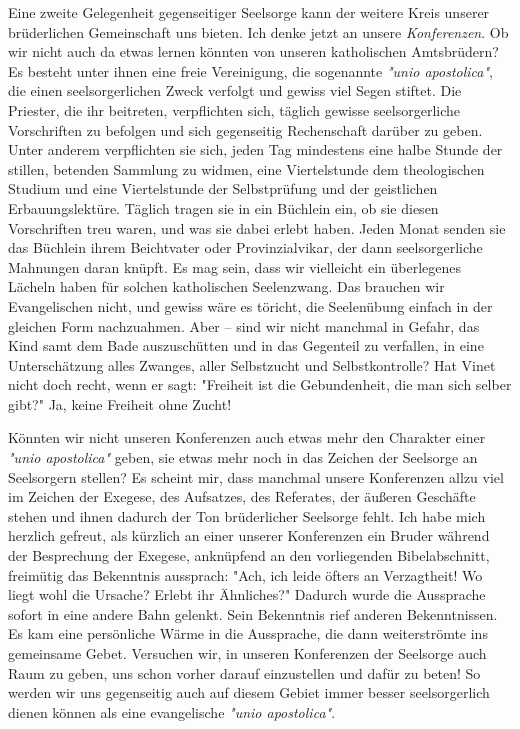 \documentclass[a5paper,openany]{book}
\begin{document}
Eine zweite Gelegenheit gegenseitiger Seelsorge kann der weitere Kreis unserer brüderlichen Gemeinschaft uns bieten. Ich denke jetzt an unsere \emph{Konferenzen}. Ob wir nicht auch da etwas lernen könnten von unseren katholischen Amtsbrüdern? Es besteht unter ihnen eine freie Vereinigung, die sogenannte \emph{"unio apostolica"}, die einen seelsorgerlichen Zweck verfolgt und gewiss viel Segen stiftet. Die Priester, die ihr beitreten, verpflichten sich, täglich gewisse seelsorgerliche Vorschriften zu befolgen und sich gegenseitig Rechenschaft darüber zu geben. Unter anderem verpflichten sie sich, jeden Tag mindestens eine halbe Stunde der stillen, betenden Sammlung zu widmen, eine Viertelstunde dem theologischen Studium und eine Viertelstunde der Selbstprüfung und der geistlichen Erbauungslektüre. Täglich tragen sie in ein Büchlein ein, ob sie diesen Vorschriften treu waren, und was sie dabei erlebt haben. Jeden Monat senden sie das Büchlein ihrem Beichtvater oder Provinzialvikar, der dann seelsorgerliche Mahnungen daran knüpft. Es mag sein, dass wir vielleicht ein überlegenes Lächeln haben für solchen katholischen Seelenzwang. Das brauchen wir Evangelischen nicht, und gewiss wäre es töricht, die Seelenübung einfach in der gleichen Form nachzuahmen. Aber – sind wir nicht manchmal in Gefahr, das Kind samt dem Bade auszuschütten und in das Gegenteil zu verfallen, in eine Unterschätzung alles Zwanges, aller Selbstzucht und Selbstkontrolle? Hat Vinet nicht doch recht, wenn er sagt: "Freiheit ist die Gebundenheit, die man sich selber gibt?" Ja, keine Freiheit ohne Zucht!
\par
Könnten wir nicht unseren Konferenzen auch etwas mehr den Charakter einer \emph{"unio apostolica"} geben, sie etwas mehr noch in das Zeichen der Seelsorge an Seelsorgern stellen? Es scheint mir, dass manchmal unsere Konferenzen allzu viel im Zeichen der Exegese, des Aufsatzes, des Referates, der äußeren Geschäfte stehen und ihnen dadurch der Ton brüderlicher Seelsorge fehlt. Ich habe mich herzlich gefreut, als kürzlich an einer unserer Konferenzen ein Bruder während der Besprechung der Exegese, anknüpfend an den vorliegenden Bibelabschnitt, freimütig das Bekenntnis aussprach: "Ach, ich leide öfters an Verzagtheit! Wo liegt wohl die Ursache? Erlebt ihr Ähnliches?" Dadurch wurde die Aussprache sofort in eine andere Bahn gelenkt. Sein Bekenntnis rief anderen Bekenntnissen. Es kam eine persönliche Wärme in die Aussprache, die dann weiterströmte ins gemeinsame Gebet. Versuchen wir, in unseren Konferenzen der Seelsorge auch Raum zu geben, uns schon vorher darauf einzustellen und dafür zu beten! So werden wir uns gegenseitig auch auf diesem Gebiet immer besser seelsorgerlich dienen können als eine evangelische \emph{"unio apostolica"}.
\end{document}
